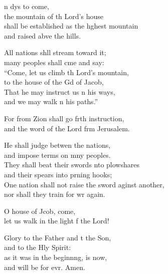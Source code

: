 \settowidth{\versewidth}{One nation shall not raise the sword against another, *}
\begin{psalmverse}%
  \begin{patverse}
n dys to come,\Med\\
the mountain of th Lord’s house\\
shall be established as the h\pointup{\i}ghest mountain\Med\\
and raised abve the hills.

All nations shll stream toward it;\Med\\
many peoples shall cme and say:\\
“Come, let us climb th Lord’s mountain,\Med\\
to the house of the Gd of Jacob,\\
That he may instruct us \pointup{\i}n his ways, \Med\\
and we may walk \pointup{\i}n his paths.”

For from Zion shall go frth instruction,\Med\\
and the word of the Lord frm Jerusalem.

He shall judge betwen the nations,\Med\\
and impose terms on mny peoples.\\
They shall beat their swords \pointup{\i}nto plowshares\Med\\
and their spears into prning hooks;\\
One nation shall not raise the sword aginst another,\Med\\
nor shall they train for wr again.

O house of Jcob, come,\Med\\
let us walk in the light f the Lord!

Glory to the Father and t the Son,\Med\\
    and to the Hly Spirit:\\
as it was in the beginn\pointup{\i}ng, is now,\Med\\
    and will be for evr. Amen.
  \end{patverse}
\end{psalmverse}
